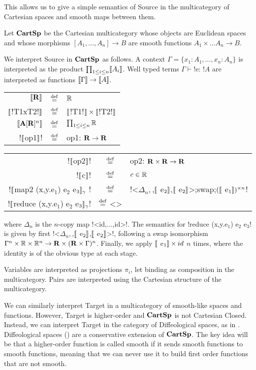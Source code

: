 This allows us to give a simple semantics of Source 
in the multicategory of Cartesian spaces and smooth maps between them. 

\begin{definition}[$\CartSp$]
Let $\CartSp$ be the Cartesian multicategory whose objects are Euclidean spaces
and whose morphisms $[A_1,\ldots,A_n]\to B$ are smooth functions $A_1\times\ldots A_n \to B$.

We interpret Source in $\CartSp$ as follows. A context $\Gamma=\{x_1:A_1,\ldots,x_n:A_n\}$ is interpreted as the product $\prod_{1\leq i \leq n}\llbracket A_i\rrbracket$.
Well typed terms $\Gamma\vdash$!e: !$A$ are interpreted as functions $\llbracket \Gamma\rrbracket\to\llbracket A\rrbracket$.

    \begin{tabular}{r c l}
    $\llbracket \mathbf{R} \rrbracket$ & $\stackrel {\mathrm{def}}=$& $\mathbb{R}$ \\
    $\llbracket$!T1xT2!$\rrbracket$ & $\stackrel {\mathrm{def}}=$& $\llbracket$!T1!$\rrbracket \times\llbracket$!T2!$\rrbracket$ \\
    $\llbracket \mathbf{A}[\mathbf{R}]^{n}\rrbracket$ & $\stackrel {\mathrm{def}}=$ & $\prod_{1\leq i \leq n} \mathbb{R}$ \\
    !$\llbracket$op1$\rrbracket$! & $\stackrel {\mathrm{def}}=$ & op1: $\mathbf{R}\to\mathbf{R}$ 
    \end{tabular}
    \begin{tabular}{r c l} 
        !$\llbracket$op2$\rrbracket$! & $\stackrel {\mathrm{def}}=$ & op2: $\mathbf{R}\times \mathbf{R}\to\mathbf{R}$ \\
        !$\llbracket$c$\rrbracket$! & $\stackrel {\mathrm{def}}=$ & $c\in\mathbb{R}$ \\
        !$\llbracket$map2 (x,y.e$_1$) e$_2$ e$_3\rrbracket_\gamma$ ! & $\stackrel {\mathrm{def}}=$ & !<$\Delta_n,$,$\llbracket$ e$_2\rrbracket$,$\llbracket$ e$_2\rrbracket$>;swap;$(\llbracket$ e$_1\rrbracket)^{\times n}$! \\
        !$\llbracket$reduce (x,y.e$_1$) e$_2$ e$_3\rrbracket_\gamma$! & $\stackrel {\mathrm{def}}=$ <> &
    \end{tabular}
where $\Delta_n$ is the $n$-copy map !<id,$\ldots$,id>!.
The semantics for !reduce (x,y.e$_1$) e$_2$ e$_3$! is given by first !<$\Delta_n,$,$\llbracket$ e$_2\rrbracket$,$\llbracket$ e$_2\rrbracket$>!, following a swap isomorphism  $\Gamma^n \times \mathbb{R} \times \mathbb{R}^n \to \mathbf{R} \times (\mathbf{R} \times \Gamma)^n$. 
Finally, we apply $\llbracket$ e$_1\rrbracket \times id$ $n$ times, where the identity is of the obvious type at each stage.

Variables are interpreted as projections $\pi_i$, let binding as composition in the multicategory. 
Pairs are interpreted using the Cartesian structure of the multicategory.
\end{definition}

We can similarly interpret Target in a multicategory of smooth-like spaces and functions. 
However, Target is higher-order and $\CartSp$ is not Cartesian Closed. 
Instead, we can interpret Target in the category of Diffeological spaces, 
as in \cite{huot2020correctness}. 
Diffeological spaces (\cite{iglesias2013diffeology}) are a conservative extension of $\CartSp$. 
The key idea will be that a higher-order function is called smooth if it sends smooth functions to smooth functions, meaning that we can never use it
to build first order functions that are not smooth.


